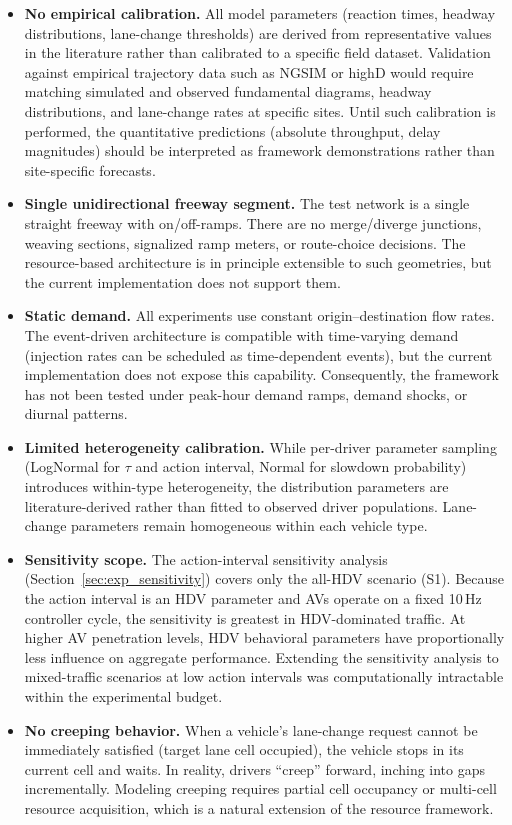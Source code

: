 \documentclass[review,authoryear]{elsarticle}
\begin{document}
\begin{itemize}
    \item \textbf{No empirical calibration.} All model parameters (reaction times, headway distributions, lane-change thresholds) are derived from representative values in the literature rather than calibrated to a specific field dataset. Validation against empirical trajectory data such as NGSIM or highD would require matching simulated and observed fundamental diagrams, headway distributions, and lane-change rates at specific sites. Until such calibration is performed, the quantitative predictions (absolute throughput, delay magnitudes) should be interpreted as framework demonstrations rather than site-specific forecasts.

    \item \textbf{Single unidirectional freeway segment.} The test network is a single straight freeway with on/off-ramps. There are no merge/diverge junctions, weaving sections, signalized ramp meters, or route-choice decisions. The resource-based architecture is in principle extensible to such geometries, but the current implementation does not support them.

    \item \textbf{Static demand.} All experiments use constant origin--destination flow rates. The event-driven architecture is compatible with time-varying demand (injection rates can be scheduled as time-dependent events), but the current implementation does not expose this capability. Consequently, the framework has not been tested under peak-hour demand ramps, demand shocks, or diurnal patterns.

    \item \textbf{Limited heterogeneity calibration.} While per-driver parameter sampling (LogNormal for $\tau$ and action interval, Normal for slowdown probability) introduces within-type heterogeneity, the distribution parameters are literature-derived rather than fitted to observed driver populations. Lane-change parameters remain homogeneous within each vehicle type.

    \item \textbf{Sensitivity scope.} The action-interval sensitivity analysis (Section~\ref{sec:exp_sensitivity}) covers only the all-HDV scenario (S1). Because the action interval is an HDV parameter and AVs operate on a fixed 10\,Hz controller cycle, the sensitivity is greatest in HDV-dominated traffic. At higher AV penetration levels, HDV behavioral parameters have proportionally less influence on aggregate performance. Extending the sensitivity analysis to mixed-traffic scenarios at low action intervals was computationally intractable within the experimental budget.

    \item \textbf{No creeping behavior.} When a vehicle's lane-change request cannot be immediately satisfied (target lane cell occupied), the vehicle stops in its current cell and waits. In reality, drivers ``creep'' forward, inching into gaps incrementally. Modeling creeping requires partial cell occupancy or multi-cell resource acquisition, which is a natural extension of the resource framework.
\end{itemize}
\end{document}
